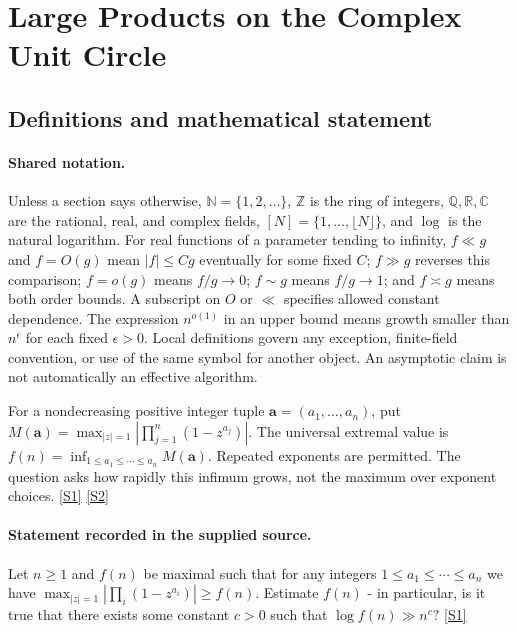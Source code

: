 \documentclass[11pt,a4paper]{article}
\newcommand{\N}{\mathbb{N}}
\newcommand{\Z}{\mathbb{Z}}
\newcommand{\Q}{\mathbb{Q}}
\newcommand{\R}{\mathbb{R}}
\newcommand{\C}{\mathbb{C}}
\newcommand{\sref}[2]{\hyperlink{source:#1:#2}{[S#2]}}
\begin{document}
\section{Large Products on the Complex Unit Circle}\label{statement}


\subsection{Definitions and mathematical statement}

\paragraph{Shared notation.}Unless a section says otherwise, $\N=\{1,2,\ldots\}$,
$\Z$ is the ring of integers, $\Q,\R,\C$ are the rational, real, and complex
fields, $[N]=\{1,\ldots,\lfloor N\rfloor\}$, and $\log$ is the natural
logarithm. For real functions of a parameter tending to infinity,
$f\ll g$ and $f=O(g)$ mean $|f|\leq Cg$ eventually for some fixed $C$;
$f\gg g$ reverses this comparison; $f=o(g)$ means $f/g\to0$;
$f\sim g$ means $f/g\to1$; and $f\asymp g$ means both order bounds.
A subscript on $O$ or $\ll$ specifies allowed constant dependence.
The expression $n^{o(1)}$ in an upper bound means growth smaller than
$n^\epsilon$ for each fixed $\epsilon>0$. Local definitions govern any
exception, finite-field convention, or use of the same symbol for another
object. An asymptotic claim is not automatically an effective algorithm.



For a nondecreasing positive integer tuple $\mathbf a=(a_1,\ldots,a_n)$, put $M(\mathbf a)=\max_{|z|=1}|\prod_{j=1}^{n}(1-z^{a_j})|$. The universal extremal value is $f(n)=\inf_{1\leq a_1\leq\cdots\leq a_n}M(\mathbf a)$. Repeated exponents are permitted. The question asks how rapidly this infimum grows, not the maximum over exponent choices. \sref{statement}{1} \sref{statement}{2}

\paragraph{Statement recorded in the supplied source.}
Let $n\geq 1$ and $f(n)$ be maximal such that for any integers $1\leq a_1\leq \cdots \leq a_n$ we have $ \max_{\lvert z\rvert=1}\left\lvert \prod_{i}(1-z^{a_i})\right\rvert\geq f(n). $ Estimate $f(n)$ - in particular, is it true that there exists some constant $c>0$ such that $ \log f(n) \gg n^c? $ \sref{statement}{1}
\end{document}

